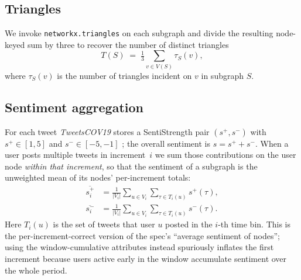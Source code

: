 \documentclass[conference]{IEEEtran}
\begin{document}
\subsection{Triangles}
We invoke \texttt{networkx.triangles} on each subgraph and
divide the resulting node-keyed sum by three to recover the
number of distinct triangles
\begin{equation}
  T(S) \;=\; \tfrac{1}{3}\!\sum_{v \in V(S)} \tau_{S}(v),
  \label{eq:triangles}
\end{equation}
where $\tau_{S}(v)$ is the number of triangles incident on $v$
in subgraph $S$.

\subsection{Sentiment aggregation}
\label{sec:sent-method}
For each tweet \textit{TweetsCOV19} stores a SentiStrength pair
$(s^{+}, s^{-})$ with $s^{+} \in [1,5]$ and
$s^{-} \in [-5,-1]$ \cite{thelwall2010sentiment}; the overall
sentiment is $s = s^{+} + s^{-}$.  When a user posts multiple
tweets in increment~$i$ we sum those contributions on the user
node \emph{within that increment}, so that the sentiment of a
subgraph is the unweighted mean of its nodes' per-increment
totals:
\begin{align}
  \overline{s^{+}_{i}} &=
    \tfrac{1}{|V_{i}|}
    \!\sum_{u \in V_{i}}\!
    \sum_{\tau \in T_{i}(u)} s^{+}(\tau),
  \label{eq:posbar}\\[-2pt]
  \overline{s^{-}_{i}} &=
    \tfrac{1}{|V_{i}|}
    \!\sum_{u \in V_{i}}\!
    \sum_{\tau \in T_{i}(u)} s^{-}(\tau).
  \label{eq:negbar}
\end{align}
Here $T_{i}(u)$ is the set of tweets that user $u$ posted in
the $i$-th time bin.  This is the per-increment-correct version
of the spec's ``average sentiment of nodes''; using the
window-cumulative attributes instead spuriously inflates the
first increment because users active early in the window
accumulate sentiment over the whole period.
\end{document}

